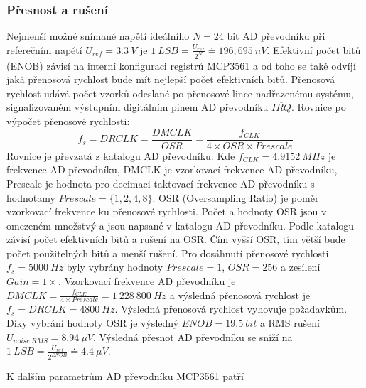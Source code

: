\subsubsection{Přesnost a rušení}
Nejmenší možné snímané napětí ideálního $N = 24$ bit AD převodníku při referečním napětí $U_{ref} = 3.3 \ V $ je $ 1 \ LSB = \frac{U_{ref}}{2^{N}} \doteq  196,695  \ nV$.
Efektivní počet bitů (ENOB) závisí na interní konfiguraci registrů MCP3561 a od toho se také odvíjí jaká přenosová rychlost bude mít nejlepší počet efektivních bitů. Přenosová rychlost udává počet vzorků odeslané po přenosové lince nadřazenému systému, signalizovaném výstupním digitálním pinem AD převodníku $\overline{IRQ}$.
Rovnice po výpočet přenosové rychlosti:
\begin{equation}
    f_s = DRCLK = \frac{DMCLK}{OSR} =\frac{f_{CLK}}{4 \times OSR \times Prescale}
\end{equation}
Rovnice je převzatá z katalogu AD převodníku. Kde $f_{CLK} = 4.9152 \ MHz$ je frekvence AD převodníku, DMCLK je vzorkovací frekvence AD převodníku, Prescale je hodnota pro decimaci taktovací frekvence AD převodníku s hodnotamy $Prescale = \{1, 2, 4, 8\}$.  OSR (Oversampling Ratio) je poměr vzorkovací frekvence ku přenosové rychlosti. Počet a hodnoty OSR jsou v omezeném množstvý a jsou napsané v katalogu AD převodníku. Podle katalogu závisí počet efektivních bitů a rušení na OSR.
Čím vyšší OSR, tím větší bude počet použitelných bitů a menší rušení. Pro dosáhnutí přenosové rychlosti $f_s = 5000 \ Hz$ byly vybrány hodnoty $Prescale = 1$, $OSR = 256$ a zesílení $Gain = 1 \times$. Vzorkovací frekvence AD převodníku je $DMCLK = \frac{f_{CLK}}{4 \times Prescale} = 1 \ 228 \ 800 \ Hz$ a výsledná přenosová rychlost je $f_s = DRCLK = 4800 \ Hz$. Výsledná přenosová rychlost vyhovuje požadavkům. Díky vybrání hodnoty OSR je výsledný $ENOB = 19.5 \ bit$ a RMS rušení $U_{noise \ RMS} = 8.94 \ \mu V$.
Výsledná přesnot AD převodníku se sníží na $ 1 \ LSB = \frac{U_{ref}}{2^{ENOB}} \doteq  4.4 \ \mu V$.
\par
K dalším parametrům AD převodníku MCP3561 patří
